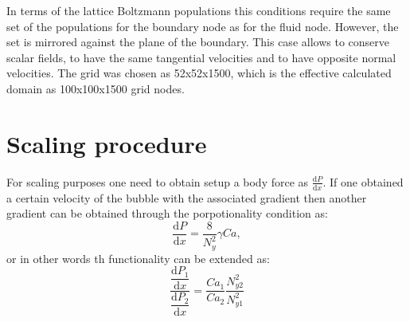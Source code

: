 \documentclass{article}
\begin{document}
In terms of the lattice Boltzmann populations this conditions require the same set of the
populations for the boundary node as for the fluid node. However, the set is mirrored against the
plane of the boundary. This case allows to conserve scalar fields, to have the same tangential
velocities and to have opposite normal velocities. The grid was chosen as 52x52x1500, which is the
effective calculated domain as 100x100x1500 grid nodes. 

\section{Scaling procedure}
\label{append:scaling}
For scaling purposes one need to obtain setup a body force as $\frac{\mathrm{d}P}{\mathrm{d}x}$. If
one obtained a certain velocity of the bubble with the associated gradient then another gradient
can be obtained through the porpotionality condition as:
\begin{equation}
\frac{\mathrm{d}P}{\mathrm{d}x}=\frac{8}{N_y^2} \gamma Ca,
\end{equation}
or in other words th functionality can be extended as:
\begin{equation}
\dfrac{\dfrac{\mathrm{d}P_1}{\mathrm{d}x}}{\dfrac{\mathrm{d}P_2}{\mathrm{d}x}}=\frac{Ca_1}{Ca_2}
\frac{N_{
y2}^2 }{N_{y1}^2}
\end{equation}




\end{document}
